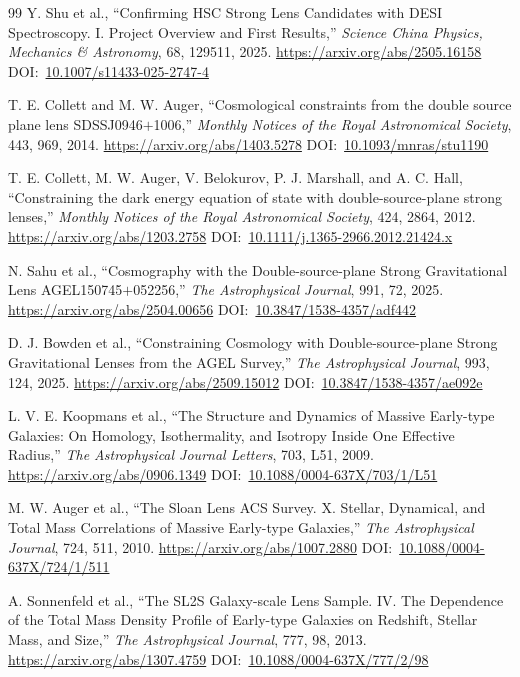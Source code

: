 \documentclass[10pt,onecolumn]{article}
\newcommand{\doi}[1]{DOI:~\href{https://doi.org/#1}{#1}}
\begin{document}
\begin{thebibliography}{99}
Y. Shu et al.,
``Confirming HSC Strong Lens Candidates with DESI Spectroscopy. I. Project Overview and First Results,''
\emph{Science China Physics, Mechanics \& Astronomy}, 68, 129511, 2025.
\url{https://arxiv.org/abs/2505.16158}
\doi{10.1007/s11433-025-2747-4}

T. E. Collett and M. W. Auger,
``Cosmological constraints from the double source plane lens SDSSJ0946$+$1006,''
\emph{Monthly Notices of the Royal Astronomical Society}, 443, 969, 2014.
\url{https://arxiv.org/abs/1403.5278}
\doi{10.1093/mnras/stu1190}

T. E. Collett, M. W. Auger, V. Belokurov, P. J. Marshall, and A. C. Hall,
``Constraining the dark energy equation of state with double-source-plane strong lenses,''
\emph{Monthly Notices of the Royal Astronomical Society}, 424, 2864, 2012.
\url{https://arxiv.org/abs/1203.2758}
\doi{10.1111/j.1365-2966.2012.21424.x}

N. Sahu et al.,
``Cosmography with the Double-source-plane Strong Gravitational Lens AGEL150745$+$052256,''
\emph{The Astrophysical Journal}, 991, 72, 2025.
\url{https://arxiv.org/abs/2504.00656}
\doi{10.3847/1538-4357/adf442}

D. J. Bowden et al.,
``Constraining Cosmology with Double-source-plane Strong Gravitational Lenses from the AGEL Survey,''
\emph{The Astrophysical Journal}, 993, 124, 2025.
\url{https://arxiv.org/abs/2509.15012}
\doi{10.3847/1538-4357/ae092e}

L. V. E. Koopmans et al.,
``The Structure and Dynamics of Massive Early-type Galaxies: On Homology, Isothermality, and Isotropy Inside One Effective Radius,''
\emph{The Astrophysical Journal Letters}, 703, L51, 2009.
\url{https://arxiv.org/abs/0906.1349}
\doi{10.1088/0004-637X/703/1/L51}

M. W. Auger et al.,
``The Sloan Lens ACS Survey. X. Stellar, Dynamical, and Total Mass Correlations of Massive Early-type Galaxies,''
\emph{The Astrophysical Journal}, 724, 511, 2010.
\url{https://arxiv.org/abs/1007.2880}
\doi{10.1088/0004-637X/724/1/511}

A. Sonnenfeld et al.,
``The SL2S Galaxy-scale Lens Sample. IV. The Dependence of the Total Mass Density Profile of Early-type Galaxies on Redshift, Stellar Mass, and Size,''
\emph{The Astrophysical Journal}, 777, 98, 2013.
\url{https://arxiv.org/abs/1307.4759}
\doi{10.1088/0004-637X/777/2/98}


\end{thebibliography}
\end{document}
